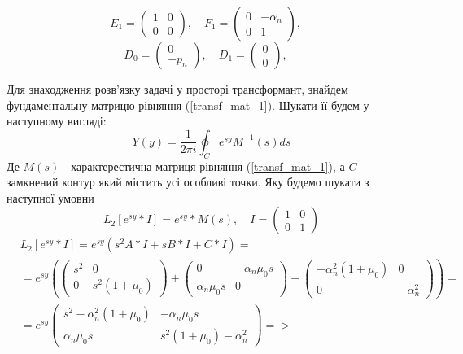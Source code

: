 \begin{equation*}
    E_1 = \begin{pmatrix}
        1 & 0 \\
        0 & 0
    \end{pmatrix}, \quad
    F_1 = \begin{pmatrix}
        0 & -\alpha_n \\
        0 & 1
    \end{pmatrix}, \quad
\end{equation*}
\begin{equation*}
    D_0 = \begin{pmatrix}
        0 \\
        -p_n
    \end{pmatrix}, \quad
    D_1 = \begin{pmatrix}
        0 \\
        0
    \end{pmatrix}, \quad
\end{equation*}

Для знаходження розв'язку задачі у просторі трансформант, знайдем фундаментальну матрицю рівняння (\ref{transf_mat_1}).
Шукати її будем у наступному вигляді:
\begin{equation}
    Y(y) = \frac{1}{2\pi i} \oint_C e^{sy} M^{-1}(s)ds
\end{equation}
Де $M(s)$ - характерестична матриця рівняння (\ref{transf_mat_1}), а $C$ - замкнений контур який містить усі особливі точки. Яку будемо шукати з наступної умовни
\begin{equation}
    L_2\left[ e^{sy}*I \right] = e^{sy} * M(s), \quad I = \begin{pmatrix} 1 & 0 \\ 0 & 1 \end{pmatrix}
\end{equation}
\begin{align*}
    &L_2\left[ e^{sy}*I \right] = e^{sy} \left( s^2A * I + s B*I + C*I \right) = \\
    &=e^{sy} \left( \begin{pmatrix}
        s^2 & 0 \\
        0 & s^2 (1 + \mu_0)
    \end{pmatrix} + \begin{pmatrix}
        0 & -\alpha_n \mu_0 s\\
        \alpha_n \mu_0 s & 0
    \end{pmatrix} + \begin{pmatrix}
        -\alpha_n^2(1 + \mu_0) & 0 \\
        0 & -\alpha_n^2
    \end{pmatrix} \right) =  \\
    &=e^{sy} \begin{pmatrix}
        s^2 -\alpha_n^2(1 + \mu_0) & -\alpha_n \mu_0 s \\
        \alpha_n \mu_0 s & s^2 (1 + \mu_0) -\alpha_n^2
     \end{pmatrix} =>
\end{align*}


